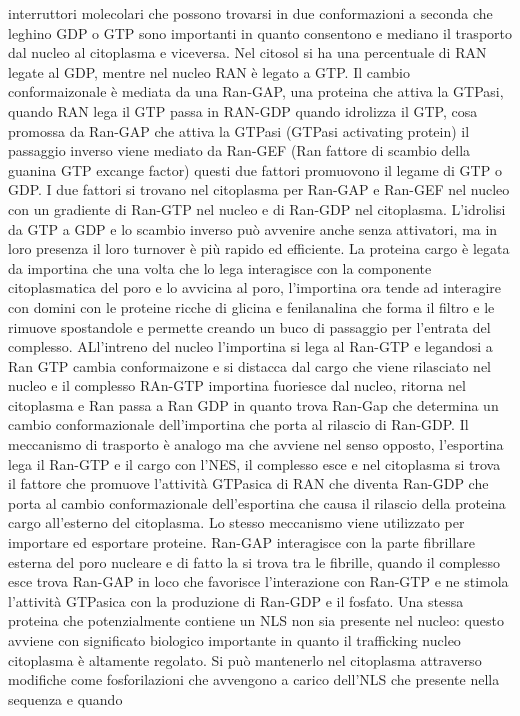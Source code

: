 interruttori molecolari che possono trovarsi in due conformazioni a seconda che leghino GDP o GTP sono importanti in quanto consentono e mediano il trasporto dal nucleo al citoplasma e
viceversa. Nel citosol si ha una percentuale di RAN legate al GDP, mentre nel nucleo RAN \`e legato a GTP. Il cambio conformaizonale \`e mediata da una Ran-GAP, una proteina che attiva 
la GTPasi, quando RAN lega il GTP passa in RAN-GDP quando idrolizza il GTP, cosa promossa da Ran-GAP che attiva la GTPasi (GTPasi activating protein) il passaggio inverso viene mediato da
Ran-GEF (Ran fattore di scambio della guanina GTP excange factor) questi due fattori promuovono il legame di GTP o GDP. I due fattori si trovano nel citoplasma per Ran-GAP e Ran-GEF 
nel nucleo con un gradiente di Ran-GTP nel nucleo e di Ran-GDP nel citoplasma. L'idrolisi da GTP a GDP e lo scambio inverso pu\`o avvenire anche senza attivatori, ma in loro presenza il
loro turnover \`e pi\`u rapido ed efficiente. La proteina cargo \`e legata da importina che una volta che lo lega interagisce con la componente citoplasmatica del poro e lo avvicina al 
poro, l'importina ora tende ad interagire con domini con le proteine ricche di glicina e fenilanalina che forma il filtro e le rimuove spostandole e permette creando un buco di passaggio
per l'entrata del complesso. ALl'intreno del nucleo l'importina si lega al Ran-GTP e legandosi a Ran GTP cambia conformaizone e si distacca dal cargo che viene rilasciato nel nucleo e 
il complesso RAn-GTP importina fuoriesce dal nucleo, ritorna nel citoplasma e Ran passa a Ran GDP in quanto trova Ran-Gap che determina un cambio conformazionale dell'importina che porta
al rilascio di Ran-GDP. Il meccanismo di trasporto \`e analogo ma che avviene nel senso opposto, l'esportina lega il Ran-GTP e il cargo con l'NES, il complesso esce e nel citoplasma si
trova il fattore che promuove l'attivit\`a GTPasica di RAN che diventa Ran-GDP che porta al cambio conformazionale dell'esportina che causa il rilascio della proteina cargo all'esterno 
del citoplasma. Lo stesso meccanismo viene utilizzato per importare ed esportare proteine. Ran-GAP interagisce con la parte fibrillare esterna del poro nucleare e di fatto la si 
trova tra le fibrille, quando il complesso esce trova Ran-GAP in loco che favorisce l'interazione con Ran-GTP e ne stimola l'attivit\`a GTPasica con la produzione di Ran-GDP e 
il fosfato. Una stessa proteina che potenzialmente contiene un NLS non sia presente nel nucleo: questo avviene con significato biologico importante in quanto il trafficking nucleo
citoplasma \`e altamente regolato. Si pu\`o mantenerlo nel citoplasma attraverso modifiche come fosforilazioni che avvengono a carico dell'NLS che presente nella sequenza e quando
